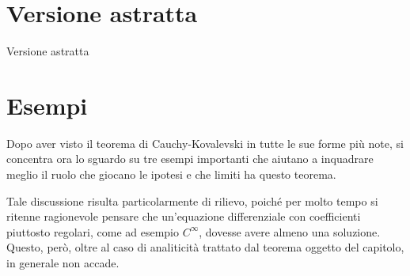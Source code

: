 \section{Versione astratta}
Versione astratta

\section{Esempi}
Dopo aver visto il teorema di Cauchy-Kovalevski in tutte le sue forme più note, si concentra ora lo sguardo su tre esempi importanti  che aiutano a inquadrare meglio il ruolo che giocano le ipotesi e che limiti ha questo teorema.

Tale discussione risulta particolarmente di rilievo, poiché per molto tempo si ritenne ragionevole pensare che un'equazione differenziale con coefficienti piuttosto regolari, come ad esempio $C^\infty$, dovesse avere almeno una soluzione. Questo, però, oltre al caso di analiticità trattato dal teorema oggetto del capitolo, in generale non accade.

\setcounter{example}{0}

